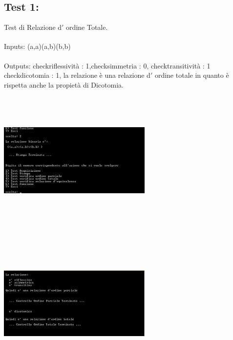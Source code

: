 \documentclass[11pt, a4paper, titlepage, block]{article}
\begin{document}
	\subsection{Test 1:}
	Test di Relazione d$'$ ordine Totale.\\
	\\
	Inputs: (a,a)(a,b)(b,b)\\
	\\
	Outputs: checkriflessivit\`a : 1,checksimmetria : 0, checktransitivit\`a : 1
	checkdicotomia : 1, la relazione \`e una relazione d$'$ ordine totale in quanto \`e rispetta anche la propiet\`a di Dicotomia.\\
	\includegraphics[width=3in,height=3in,viewport=0 0 300 300]{../Screenshots/Test1Input.jpg}
	\\
	\includegraphics[width=3in,height=3in,viewport=0 0 300 300]{../Screenshots/Test1Output.png}
	\newpage
\end{document}
